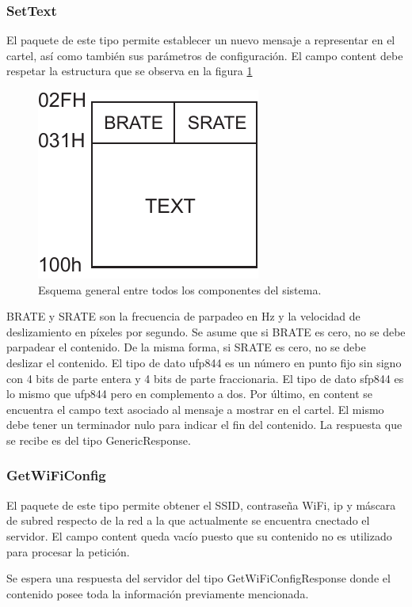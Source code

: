 \subsubsection{SetText}

El paquete de este tipo permite establecer un nuevo mensaje a representar en el cartel, así como también sus parámetros de configuración.
El campo content debe respetar la estructura que se observa en la figura \ref{fig:paquete-anim}


\begin{figure}[!ht]
	\centering
	\includegraphics[width=0.3\linewidth]{imagenes/protocolo/paquete-anim.pdf}
	\caption{Esquema general entre todos los componentes del sistema.}
	\label{fig:paquete-anim}
\end{figure}

BRATE y SRATE son la frecuencia de parpadeo en Hz y la velocidad de deslizamiento en píxeles por segundo.
Se asume que si BRATE es cero, no se debe parpadear el contenido.
De la misma forma, si SRATE es cero, no se debe deslizar el contenido.
El tipo de dato ufp844 es un número en punto fijo sin signo con 4 bits de parte entera y 4 bits de parte fraccionaria.
El tipo de dato sfp844 es lo mismo que ufp844 pero en complemento a dos.
Por último, en content se encuentra el campo text asociado al mensaje a mostrar en el cartel.
El mismo debe tener un terminador nulo para indicar el fin del contenido.
La respuesta que se recibe es del tipo GenericResponse.



\subsubsection{GetWiFiConfig}

El paquete de este tipo permite obtener el SSID, contraseña WiFi, ip y máscara de subred respecto de la red a la que actualmente se encuentra cnectado el servidor.
El campo content queda vacío puesto que su contenido no es utilizado para procesar la petición.

Se espera una respuesta del servidor del tipo GetWiFiConfigResponse donde el contenido posee toda la información previamente mencionada.



